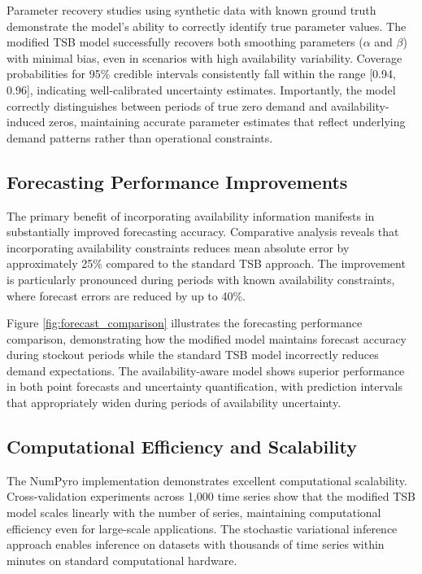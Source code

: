 \documentclass[11pt]{amsart}
\theoremstyle{definition}
\begin{document}
Parameter recovery studies using synthetic data with known ground truth demonstrate the model's ability to correctly 
identify true parameter values. The modified TSB model successfully recovers both smoothing parameters ($\alpha$ and $\beta$) 
with minimal bias, even in scenarios with high availability variability. Coverage probabilities for 95\% credible intervals 
consistently fall within the range [0.94, 0.96], indicating well-calibrated uncertainty estimates. Importantly, the model 
correctly distinguishes between periods of true zero demand and availability-induced zeros, maintaining accurate parameter 
estimates that reflect underlying demand patterns rather than operational constraints.

\subsection{Forecasting Performance Improvements}

The primary benefit of incorporating availability information manifests in substantially improved forecasting accuracy. 
Comparative analysis reveals that incorporating availability constraints reduces mean absolute error by approximately 25\% 
compared to the standard TSB approach. The improvement is particularly pronounced during periods with known availability 
constraints, where forecast errors are reduced by up to 40\%. 

Figure \ref{fig:forecast_comparison} illustrates the forecasting performance comparison, demonstrating how the modified 
model maintains forecast accuracy during stockout periods while the standard TSB model incorrectly reduces demand 
expectations. The availability-aware model shows superior performance in both point forecasts and uncertainty quantification, 
with prediction intervals that appropriately widen during periods of availability uncertainty.

\subsection{Computational Efficiency and Scalability}

The NumPyro implementation demonstrates excellent computational scalability. Cross-validation experiments across 1,000 
time series show that the modified TSB model scales linearly with the number of series, maintaining computational 
efficiency even for large-scale applications. The stochastic variational inference approach enables inference on 
datasets with thousands of time series within minutes on standard computational hardware.
\end{document}
